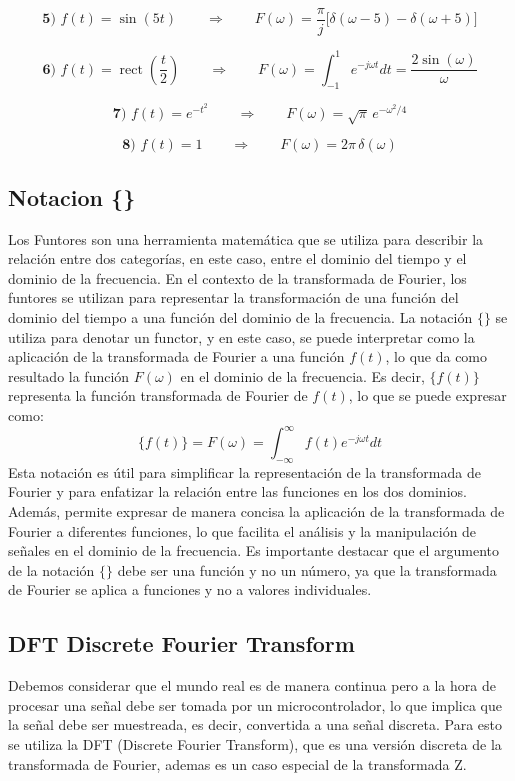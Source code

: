 \documentclass[12pt]{article}
\begin{document}
\[
\textbf{5) } f(t)=\sin(5t)
\qquad\Longrightarrow\qquad
F(\omega)=\frac{\pi}{j}\big[\delta(\omega-5)-\delta(\omega+5)\big]
\]

\[
\textbf{6) } f(t)=\operatorname{rect}\!\left(\frac{t}{2}\right)
\qquad\Longrightarrow\qquad
F(\omega)=\int_{-1}^{1}e^{-j\omega t}dt
=\frac{2\sin(\omega)}{\omega}
\]

\[
\textbf{7) } f(t)=e^{-t^2}
\qquad\Longrightarrow\qquad
F(\omega)=\sqrt{\pi}\,e^{-\omega^2/4}
\]

\[
\textbf{8) } f(t)=1
\qquad\Longrightarrow\qquad
F(\omega)=2\pi\,\delta(\omega)
\]

\subsection{Notacion \{\} }
Los Funtores son una herramienta matemática que se utiliza para describir la relación entre dos categorías, en este caso, entre el dominio del tiempo y el dominio de la frecuencia. En el contexto de la transformada de Fourier, los funtores se utilizan para representar la transformación de una función del dominio del tiempo a una función del dominio de la frecuencia. La notación $\{\}$ se utiliza para denotar un functor, y en este caso, se puede interpretar como la aplicación de la transformada de Fourier a una función $f(t)$, lo que da como resultado la función $F(\omega)$ en el dominio de la frecuencia. Es decir, $\{f(t)\}$ representa la función transformada de Fourier de $f(t)$, lo que se puede expresar como:
$$\{f(t)\} = F(\omega) = \int_{-\infty}^{\infty} f(t) e^{-j\omega t} dt$$
Esta notación es útil para simplificar la representación de la transformada de Fourier y para enfatizar la relación entre las funciones en los dos dominios. Además, permite expresar de manera concisa la aplicación de la transformada de Fourier a diferentes funciones, lo que facilita el análisis y la manipulación de señales en el dominio de la frecuencia. Es importante destacar que el argumento de la notación $\{\}$ debe ser una función y no un número, ya que la transformada de Fourier se aplica a funciones y no a valores individuales.


\subsection{DFT Discrete Fourier Transform}
Debemos considerar que el mundo real es de manera continua pero a la hora de procesar una señal debe ser tomada por un microcontrolador, lo que implica que la señal debe ser muestreada, es decir, convertida a una señal discreta. 
Para esto se utiliza la DFT (Discrete Fourier Transform), que es una versión discreta de la transformada de Fourier, ademas es un caso especial de la transformada Z.  \cite{wolfram-dft}
\end{document}
